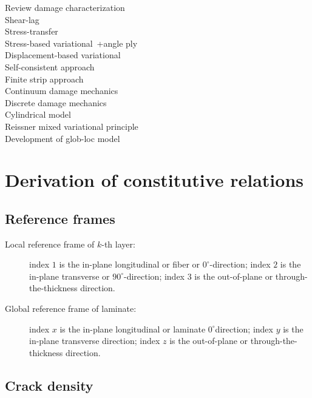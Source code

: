 \documentclass[review]{elsarticle}
\begin{document}
Review damage characterization~\cite{Talreja1991,Nairn2000,Berthelot2003}\\
Shear-lag~\cite{Garrett1977}\\
Stress-transfer~\cite{HenaffGardin1996,McCartney1992}\\
Stress-based variational~\cite{Hashin1985,Hashin1987,Vinogradov2010}+angle ply~\cite{Vinogradov2010}\\
Displacement-based variational~\cite{Berthelot1996}\\
Self-consistent approach~\cite{Laws1983}\\
Finite strip approach~\cite{Li1994}\\
Continuum damage mechanics~\cite{Allen1987,Ladeveze1990,Singh2008}\\
Discrete damage mechanics~\cite{Barbero2011}\\
Cylindrical model~\cite{Schoeppner1998}\\
Reissner mixed variational principle~\cite{Reddy2002}\\
Development of glob-loc model~\cite{Gudmundson1992a,Gudmundson1992b,Gudmundson1993,Lundmark2003,Lundmark2006,Varna2012,Loukil2012,Loukil2013a,Loukil2013b,Varna2016,Pupurs2016,Varna2018,Loukil2019a,Loukil2019b}



\section{Derivation of constitutive relations}

\subsection{Reference frames}

\begin{description}
\item[Local reference frame of $k$-th layer: ] index $1$ is the in-plane longitudinal or fiber or $0^{\circ}$-direction; index $2$ is the in-plane transverse or $90^{\circ}$-direction; index $3$ is the out-of-plane or through-the-thickness direction.
\item[Global reference frame of laminate: ] index $x$ is the in-plane longitudinal or laminate $0^{\circ}$direction; index $y$ is the in-plane transverse direction; index $z$ is the out-of-plane or through-the-thickness direction.
\end{description}

\subsection{Crack density}
\end{document}
